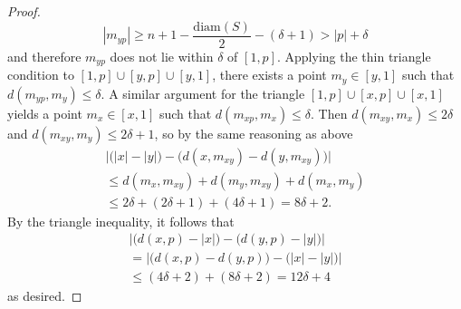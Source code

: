 \documentclass[10pt,a4paper]{amsart}
\begin{document}
\begin{proof}
\[
|m_{yp}| \geq n+1-\frac{\mathrm{diam}(S)}{2} - (\delta+1) > |p|+\delta
\]
and therefore $m_{yp}$ does not lie within $\delta$ of $[1,p]$.  Applying the thin triangle condition to $[1,p]\cup [y,p]\cup [y,1]$, there exists a point $m_{y}\in[y,1]$ such that $d(m_{yp},m_{y})\leq \delta$. A similar argument for the triangle $[1,p]\cup [x,p]\cup [x,1]$ yields a point $m_{x}\in [x,1]$ such that $d(m_{xp},m_{x})\leq \delta$.  Then $d(m_{xy},m_{x})\leq 2\delta$ and $d(m_{xy},m_{y})\leq 2\delta+1$, so by the same reasoning as above
\begin{multline*}
\bigl|\bigl(|x|-|y|\bigr) - \bigl(d(x,m_{xy}) - d(y,m_{xy})\bigr)\bigr| \\
\leq d(m_{x},m_{xy}) + d(m_{y},m_{xy}) + d(m_{x},m_{y}) \\
\leq 2\delta + (2\delta+1) + (4\delta+1) = 8\delta+2.
\end{multline*}
By the triangle inequality, it follows that
\begin{multline*}
\bigl|\bigl( d(x,p) - |x|\bigr) - \bigl(d(y,p)-|y|\bigr)\bigr| \\ =
\bigl|\bigl(d(x,p)-d(y,p)\bigr) - \bigl(|x| - |y|\bigr)\bigr| \\ \leq (4\delta+2)+ (8\delta + 2) = 12\delta + 4
\end{multline*}
as desired.
\end{proof}
\end{document}
